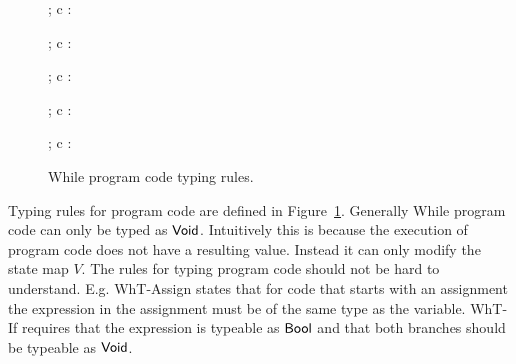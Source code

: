 \begin{figure}[h]

  \RuleSpace

  {\Gamma \vdash {}; c : \WhVoid}

  \RuleSpace 

  {\Gamma \vdash {}; c : \WhVoid}

  \RuleSpace

  {\Gamma \vdash \WhSkip; c : \WhVoid}

  \RuleSpace

  {\Gamma \vdash {}; c : \WhVoid}

  \RuleSpace

  {\Gamma \vdash {}; c : \WhVoid}

  \caption{While program code typing rules.}
  \label{fig:while_code_tpe}
\end{figure}

Typing rules for program code are defined in Figure~\ref{fig:while_code_tpe}.
Generally While program code can only be typed as $\mbox{$\mathsf{Void}$}$. Intuitively this is
because the execution of program code does not have a resulting value. Instead
it can only modify the state map $V$. The rules for typing program code should
not be hard to understand. E.g. {\sc WhT-Assign} states that for code that
starts with an assignment the expression in the assignment must be of the same
type as the variable. {\sc WhT-If} requires that the expression is typeable as
$\mbox{$\mathsf{Bool}$}$ and that both branches should be typeable as $\mbox{$\mathsf{Void}$}$.

